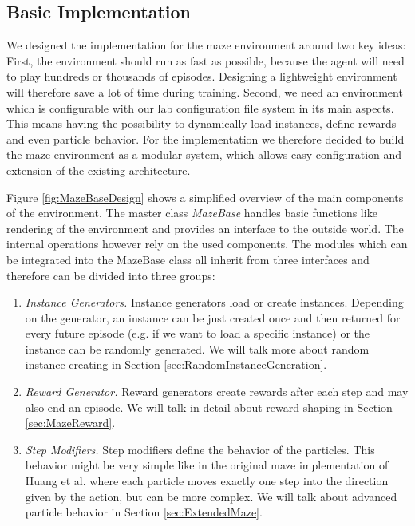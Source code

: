 \subsection{Basic Implementation} \label{sec:MazeImplementation}
We designed the implementation for the maze environment around two key ideas: First, the environment should run as fast as possible, because the agent will need to play hundreds or thousands of episodes. Designing a lightweight environment will therefore save a lot of time during training. Second, we need an environment which is configurable with our lab configuration file system in its main aspects. This means having the possibility to dynamically load instances, define rewards and even particle behavior. For the implementation we therefore decided to build the maze environment as a modular system, which allows easy configuration and extension of the existing architecture. 

Figure \ref{fig:MazeBaseDesign} shows a simplified overview of the main components of the environment. The master class \textit{MazeBase} handles basic functions like rendering of the environment and provides an interface to the outside world. The internal operations however rely on the used components. The modules which can be integrated into the MazeBase class all inherit from three interfaces and therefore can be divided into three groups:

\begin{enumerate}
    \item \textit{Instance Generators.} Instance generators load or create instances. Depending on the generator, an instance can be just created once and then returned for every future episode (e.g. if we want to load a specific instance) or the instance can be randomly generated. We will talk more about random instance creating in Section \ref{sec:RandomInstanceGeneration}.
    \item \textit{Reward Generator.} Reward generators create rewards after each step and may also end an episode. We will talk in detail about reward shaping in Section \ref{sec:MazeReward}.
    \item \textit{Step Modifiers.} Step modifiers define the behavior of the particles. This behavior might be very simple like in the original maze implementation of Huang et al. where each particle moves exactly one step into the direction given by the action, but can be more complex. We will talk about advanced particle behavior in Section \ref{sec:ExtendedMaze}. 
\end{enumerate}

